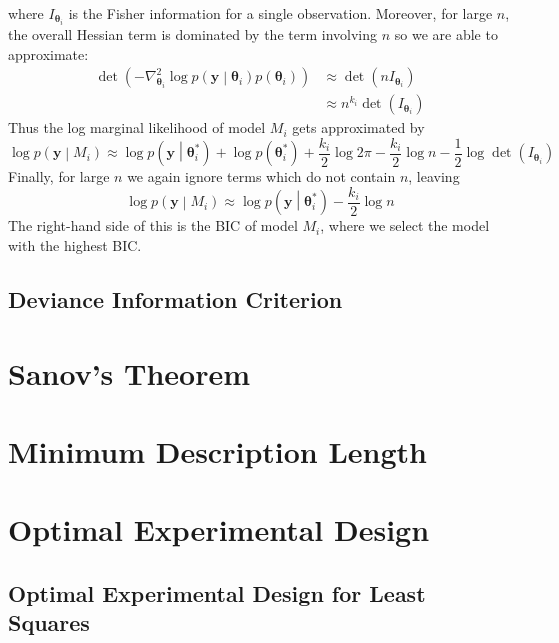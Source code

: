 \documentclass[11pt]{report} %
\begin{document}
where $I_{\boldsymbol{\theta}_{i}}$ is the Fisher information for a single observation. Moreover, for large $n$, the overall Hessian term is dominated by the term involving $n$ so we are able to approximate:
\begin{align}
\det\left(-\nabla_{\boldsymbol{\theta}_{i}}^{2}\log p\left(\mathbf{y}\middle|\boldsymbol{\theta}_{i}\right) p\left(\boldsymbol{\theta}_{i}\right)\right) &\approx \det\left(n I_{\boldsymbol{\theta}_{i}}\right) \\
&\approx n^{k_{i}}\det\left(I_{\boldsymbol{\theta}_{i}}\right)
\end{align}
Thus the log marginal likelihood of model $M_{i}$ gets approximated by
\begin{equation}
\log p\left(\mathbf{y}\middle|M_{i}\right) \approx \log p\left(\mathbf{y}\middle|\boldsymbol{\theta}_{i}^{*}\right) + \log p\left(\boldsymbol{\theta}_{i}^{*}\right) + \dfrac{k_{i}}{2}\log 2\pi  - \dfrac{k_{i}}{2}\log n - \dfrac{1}{2}\log\det\left(I_{\boldsymbol{\theta}_{i}}\right)
\end{equation}
Finally, for large $n$ we again ignore terms which do not contain $n$, leaving
\begin{equation}
\log p\left(\mathbf{y}\middle|M_{i}\right) \approx \log p\left(\mathbf{y}\middle|\boldsymbol{\theta}_{i}^{*}\right) - \dfrac{k_{i}}{2}\log n
\end{equation}
The right-hand side of this is the BIC of model $M_{i}$, where we select the model with the highest BIC.

\subsection{Deviance Information Criterion}

\section{Sanov's Theorem}

\section{Minimum Description Length}

\section{Optimal Experimental Design}

\subsection{Optimal Experimental Design for Least Squares}
\end{document}
